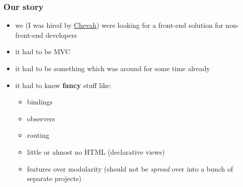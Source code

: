 \documentclass[compress]{beamer}
\begin{document}
\begin{frame}
\frametitle{Our story}

\hypertarget{why}{}

\begin{itemize}[<+->]
  \item we (I was hired by \href{https://github.com/chevah}{Chevah}) were looking for a front-end solution for non-front-end developers
  \item it had to be MVC
  \item it had to be something which was around for some time already
  \item it had to know \textbf{fancy} stuff like:
    \begin{itemize}[<+->]
      \item bindings
      \item observers
      \item routing
      \item little or almost no HTML (declarative views)
      \item features over modularity (should not be \emph{spread} over into a bunch of separate projects)
    \end{itemize}
\end{itemize}
\end{frame}
\end{document}
